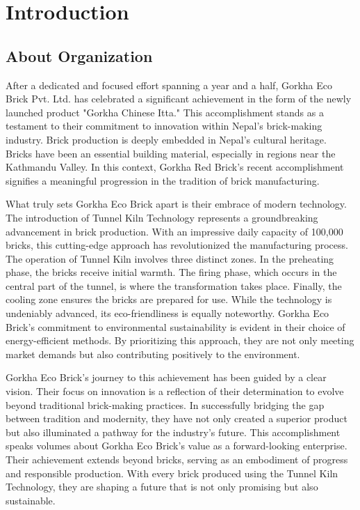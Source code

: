 \section{Introduction}
\subsection{About Organization}
After a dedicated and focused effort spanning a year and a half, Gorkha Eco Brick Pvt. Ltd. has celebrated a significant achievement in the form of the newly launched product "Gorkha Chinese Itta." This accomplishment stands as a testament to their commitment to innovation within Nepal's brick-making industry. Brick production is deeply embedded in Nepal's cultural heritage. Bricks have been an essential building material, especially in regions near the Kathmandu Valley. In this context, Gorkha Red Brick's recent accomplishment signifies a meaningful progression in the tradition of brick manufacturing.

\vspace{0.4cm}
What truly sets Gorkha Eco Brick apart is their embrace of modern technology. The introduction of Tunnel Kiln Technology represents a groundbreaking advancement in brick production. With an impressive daily capacity of 100,000 bricks, this cutting-edge approach has revolutionized the manufacturing process.
The operation of Tunnel Kiln involves three distinct zones. In the preheating phase, the bricks receive initial warmth. The firing phase, which occurs in the central part of the tunnel, is where the transformation takes place. Finally, the cooling zone ensures the bricks are prepared for use.
While the technology is undeniably advanced, its eco-friendliness is equally noteworthy. Gorkha Eco Brick's commitment to environmental sustainability is evident in their choice of energy-efficient methods. By prioritizing this approach, they are not only meeting market demands but also contributing positively to the environment.

\vspace{0.4cm}
Gorkha Eco Brick's journey to this achievement has been guided by a clear vision. Their focus on innovation is a reflection of their determination to evolve beyond traditional brick-making practices. In successfully bridging the gap between tradition and modernity, they have not only created a superior product but also illuminated a pathway for the industry's future.
This accomplishment speaks volumes about Gorkha Eco Brick's value as a forward-looking enterprise. Their achievement extends beyond bricks, serving as an embodiment of progress and responsible production. With every brick produced using the Tunnel Kiln Technology, they are shaping a future that is not only promising but also sustainable.
